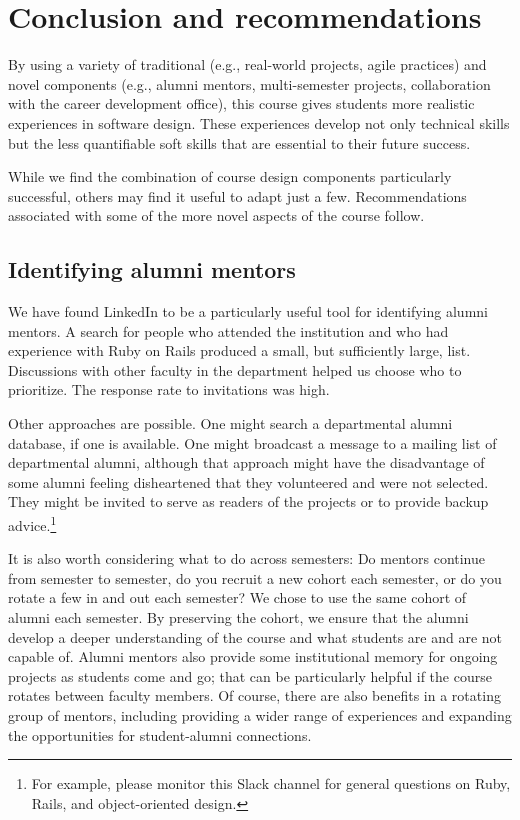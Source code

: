 \section{Conclusion and recommendations}

By using a variety of traditional (e.g., real-world projects, agile
practices) and novel components (e.g., alumni mentors, multi-semester
projects, collaboration with the career development office), this
course gives students more realistic experiences in software design.
These experiences develop not only technical skills but the less
quantifiable soft skills that are essential to their future success.

While we find the combination of course design components particularly
successful, others may find it useful to adapt just a few.  Recommendations
associated with some of the more novel aspects of the course follow.

\subsection{Identifying alumni mentors}

We have found LinkedIn to be a particularly useful tool for identifying
alumni mentors.  A search for people who attended the institution and
who had experience with Ruby on Rails produced a small, but sufficiently
large, list.  Discussions with other faculty in the department helped
us choose who to prioritize.  The response rate to invitations was high.

Other approaches are possible.  One might search a departmental
alumni database, if one is available.  One might broadcast a message
to a mailing list of departmental alumni, although that approach
might have the disadvantage of some alumni feeling disheartened
that they volunteered and were not selected.  They might be invited
to serve as readers of the projects or to provide backup
advice.\footnote{For example, please monitor this Slack channel for
general questions on Ruby, Rails, and object-oriented design.}

It is also worth considering what to do across semesters: Do mentors
continue from semester to semester, do you recruit a new cohort
each semester, or do you rotate a few in and out each semester?  We
chose to use the same cohort of alumni each semester.  By preserving
the cohort, we ensure that the alumni develop a deeper understanding
of the course and what students are and are not capable of.  Alumni
mentors also provide some institutional memory for ongoing projects
as students come and go; that can be particularly helpful if the course
rotates between faculty members.  Of course, there are also benefits in
a rotating group of mentors, including providing a wider range of
experiences and expanding the opportunities for student-alumni
connections.

